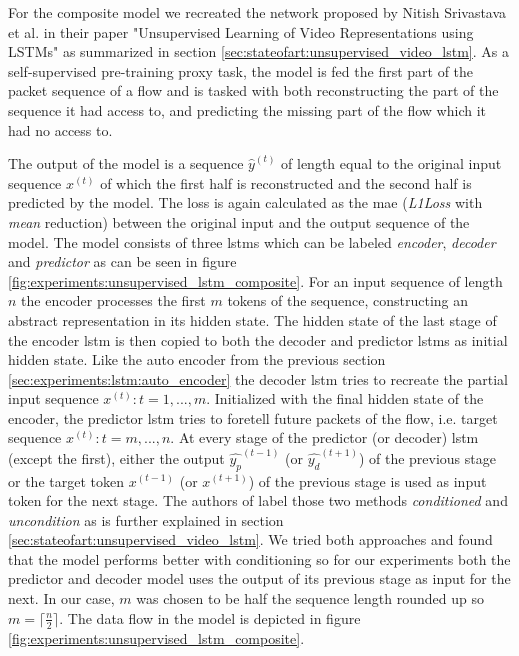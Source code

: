 For the composite model we recreated the network proposed by Nitish Srivastava et al. in their paper "Unsupervised Learning of Video Representations using LSTMs" \cite{unsupervised_learning_lstms} as summarized in section \ref{sec:stateofart:unsupervised_video_lstm}. As a self-supervised pre-training proxy task, the model is fed the first part of the packet sequence of a flow and is tasked with both reconstructing the part of the sequence it had access to, and predicting the missing part of the flow which it had no access to. \par
The output of the model is a sequence $\hat{y}^{(t)}$ of length equal to the original input sequence $x^{(t)}$ of which the first half is reconstructed and the second half is predicted by the model. The loss is again calculated as the \gls{mae} (\textit{L1Loss} with \textit{mean} reduction) between the original input and the output sequence of the model. The model consists of three \glspl{lstm} which can be labeled \textit{encoder}, \textit{decoder} and \textit{predictor} as can be seen in figure \ref{fig:experiments:unsupervised_lstm_composite}. For an input sequence of length $n$ the encoder processes the first $m$ tokens of the sequence, constructing an abstract representation in its hidden state. The hidden state of the last stage of the encoder \gls{lstm} is then copied to both the decoder and predictor \glspl{lstm} as initial hidden state. Like the auto encoder from the previous section \ref{sec:experiments:lstm:auto_encoder} the decoder \gls{lstm} tries to recreate the partial input sequence $x^{(t)}: t=1, ..., m$. Initialized with the final hidden state of the encoder, the predictor \gls{lstm} tries to foretell future packets of the flow, i.e. target sequence $x^{(t)}: t=m, ..., n$. At every stage of the predictor (or decoder) \gls{lstm} (except the first), either the output $\hat{y_p}^{(t-1)}$ (or $\hat{y_d}^{(t+1)}$) of the previous stage or the target token $x^{(t-1)}$ (or $x^{(t+1)}$) of the previous stage is used as input token for the next stage. The authors of \cite{unsupervised_learning_lstms} label those two methods \textit{conditioned} and \textit{uncondition} as is further explained in section \ref{sec:stateofart:unsupervised_video_lstm}. We tried both approaches and found that the model performs better with conditioning so for our experiments both the predictor and decoder model uses the output of its previous stage as input for the next. In our case, $m$ was chosen to be half the sequence length rounded up so $m=\lceil \frac{n}{2} \rceil$. The data flow in the model is depicted in figure \ref{fig:experiments:unsupervised_lstm_composite}. 

